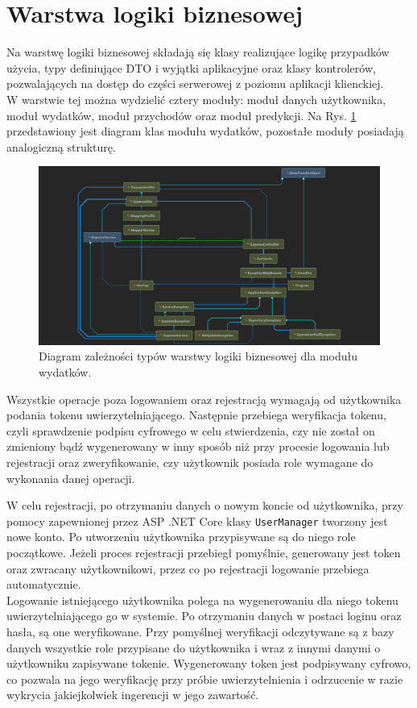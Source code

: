 \section{Warstwa logiki biznesowej}
Na warstwę logiki biznesowej składają się klasy realizujące logikę przypadków użycia, typy definiujące DTO i wyjątki aplikacyjne oraz klasy kontrolerów, pozwalających na dostęp do części serwerowej z poziomu aplikacji klienckiej.\\
W warstwie tej można wydzielić cztery moduły: moduł danych użytkownika, moduł wydatków, moduł przychodów oraz moduł predykcji. Na Rys. \ref{expensediagram} przedstawiony jest diagram klas modułu wydatków, pozostałe moduły posiadają analogiczną strukturę.
\begin{figure}[!ht]
	\begin{center}
		\includegraphics[width=6in]{img/diagram/expense_diagram.png}
		\caption{Diagram zależności typów warstwy logiki biznesowej dla modułu wydatków.}
		\label{expensediagram}
	\end{center}
\end{figure}

Wszystkie operacje poza logowaniem oraz rejestracją wymagają od użytkownika podania tokenu uwierzytelniającego. Następnie przebiega weryfikacja tokenu, czyli sprawdzenie podpisu cyfrowego w celu stwierdzenia, czy nie został on zmieniony bądź wygenerowany w inny sposób niż przy procesie logowania lub rejestracji oraz zweryfikowanie, czy użytkownik posiada role wymagane do wykonania danej operacji.

W celu rejestracji, po otrzymaniu danych o nowym koncie od użytkownika, przy pomocy zapewnionej przez ASP .NET Core klasy \lstinline|UserManager| tworzony jest nowe konto. Po utworzeniu użytkownika przypisywane są do niego role początkowe. Jeżeli proces rejestracji przebiegł pomyślnie, generowany jest token oraz zwracany użytkownikowi, przez co po rejestracji logowanie przebiega automatycznie.\\
Logowanie istniejącego użytkownika polega na wygenerowaniu dla niego tokenu uwierzytelniającego go w systemie. Po otrzymaniu danych w postaci loginu oraz hasła, są one weryfikowane. Przy pomyślnej weryfikacji odczytywane są z bazy danych wszystkie role przypisane do użytkownika i wraz z innymi danymi o użytkowniku zapisywane tokenie. Wygenerowany token jest podpisywany cyfrowo, co pozwala na jego weryfikację przy próbie uwierzytelnienia i odrzucenie w razie wykrycia jakiejkolwiek ingerencji w jego zawartość.\\

